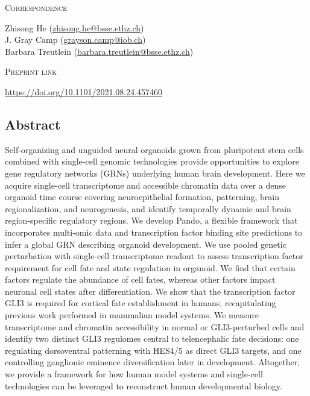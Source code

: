 \vspace{1cm}

\noindent
{\large\textsc{Correspondence}} 

\noindent
Zhisong He (\href{mailto:zhisong.he@bsse.ethz.ch}{zhisong.he@bsse.ethz.ch})\\
J. Gray Camp (\href{mailto:grayson.camp@iob.ch}{grayson.camp@iob.ch})\\
Barbara Treutlein (\href{mailto:barbara.treutlein@bsse.ethz.ch}{barbara.treutlein@bsse.ethz.ch})

\vspace{1cm}

\noindent
{\large\textsc{Preprint link}} 

\noindent
\href{https://doi.org/10.1101/2021.08.24.457460}{https://doi.org/10.1101/2021.08.24.457460}



\subsection{Abstract}
Self-organizing and unguided neural organoids grown from pluripotent stem cells combined with single-cell genomic technologies provide opportunities to explore gene regulatory networks (GRNs) underlying human brain development. Here we acquire single-cell transcriptome and accessible chromatin data over a dense organoid time course covering neuroepithelial formation, patterning, brain regionalization, and neurogenesis, and identify temporally dynamic and brain region-specific regulatory regions. We develop Pando, a flexible framework that incorporates multi-omic data and transcription factor binding site predictions to infer a global GRN describing organoid development. We use pooled genetic perturbation with single-cell transcriptome readout to assess transcription factor requirement for cell fate and state regulation in organoid. We find that certain factors regulate the abundance of cell fates, whereas other factors impact neuronal cell states after differentiation. We show that the transcription factor GLI3 is required for cortical fate establishment in humans, recapitulating previous work performed in mammalian model systems. We measure transcriptome and chromatin accessibility in normal or GLI3-perturbed cells and identify two distinct GLI3 regulomes central to telencephalic fate decisions: one regulating dorsoventral patterning with HES4/5 as direct GLI3 targets, and one controlling ganglionic eminence diversification later in development. Altogether, we provide a framework for how human model systems and single-cell technologies can be leveraged to reconstruct human developmental biology.


